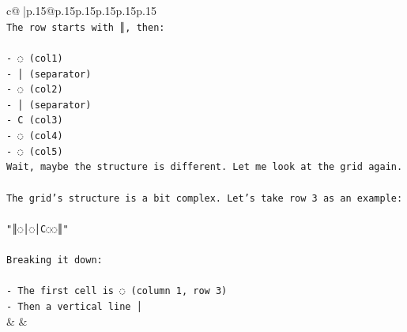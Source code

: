 \documentclass{article}
\begin{document}
{\begin{supertabular}{c@{$\;$}|p{.15\linewidth}@{}p{.15\linewidth}p{.15\linewidth}p{.15\linewidth}p{.15\linewidth}p{.15\linewidth}}
{{{\\ 
\texttt{The row starts with ║, then:} \\
\\ 
\texttt{{-} ◌ (col1)} \\
\texttt{{-} │ (separator)} \\
\texttt{{-} ◌ (col2)} \\
\texttt{{-} │ (separator)} \\
\texttt{{-} C (col3)} \\
\texttt{{-} ◌ (col4)} \\
\texttt{{-} ◌ (col5)} \\
\texttt{Wait, maybe the structure is different. Let me look at the grid again.} \\
\\ 
\texttt{The grid's structure is a bit complex. Let's take row 3 as an example:} \\
\\ 
\texttt{"║◌│◌│C◌◌║"} \\
\\ 
\texttt{Breaking it down:} \\
\\ 
\texttt{{-} The first cell is ◌ (column 1, row 3)} \\
\texttt{{-} Then a vertical line │} \\
            }
        }
    }
    & & \\ \\


\end{supertabular}}
\end{document}
